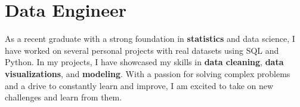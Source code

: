 
\section{Data Engineer}
\small{
    As a recent graduate with a strong foundation in \textbf{statistics} and data science, I have worked on several personal projects with real datasets using SQL and Python. In my projects, I have showcased my skills in \textbf{data cleaning}, \textbf{data visualizations}, and \textbf{modeling}. With a passion for solving complex problems and a drive to constantly learn and improve, I am excited to take on new challenges and learn from them.
}